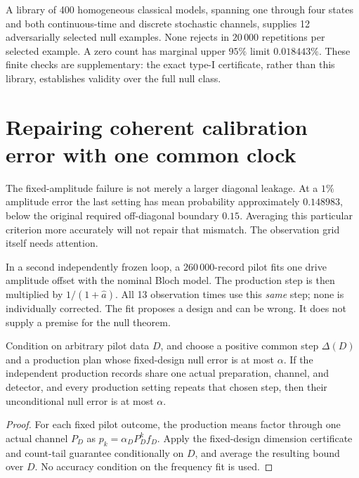 A library of 400 homogeneous classical models, spanning one through four
states and both continuous-time and discrete stochastic channels, supplies
12 adversarially selected null examples. None rejects in $20\,000$ repetitions
per selected example. A zero count has marginal upper $95\%$ limit
$0.018443\%$. These finite checks are supplementary: the exact type-I
certificate, rather than this library, establishes validity over the full null
class.

\section{Repairing coherent calibration error with one common clock}
The fixed-amplitude failure is not merely a larger diagonal leakage. At a
$1\%$ amplitude error the last setting has mean probability approximately
$0.148983$, below the original required off-diagonal boundary $0.15$.
Averaging this particular criterion more accurately will not repair that
mismatch. The observation grid itself needs attention.

In a second independently frozen loop, a $260\,000$-record pilot fits one drive
amplitude offset with the nominal Bloch model. The production step is then
multiplied by $1/(1+\widehat a)$. All 13 observation times use this \emph{same}
step; none is individually corrected. The fit proposes a design and can be
wrong. It does not supply a premise for the null theorem.

\begin{proposition}
Condition on arbitrary pilot data $D$, and choose a positive common step
$\Delta(D)$ and a production plan whose fixed-design null error is at most
$\alpha$. If the independent production records share one actual preparation,
channel, and detector, and every production setting repeats that chosen step,
then their unconditional null error is at most $\alpha$.
\end{proposition}
\begin{proof}
For each fixed pilot outcome, the production means factor through one actual
channel $P_D$ as $p_k=\alpha_D P_D^k f_D$. Apply the fixed-design dimension
certificate and count-tail guarantee conditionally on $D$, and average the
resulting bound over $D$. No accuracy condition on the frequency fit is used.
\end{proof}

